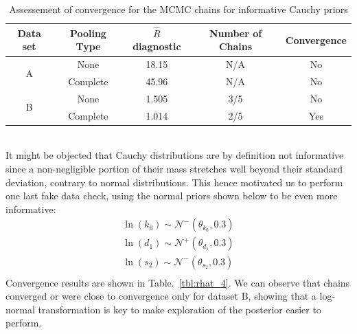\documentclass[11pt]{article}
\begin{document}
\begin{table}[!h]
    \centering
    \caption{Assessement of convergence for the MCMC chains for informative Cauchy priors}
    \begin{tabular}{c|c||c|c|c}
        \hline
        Data set & Pooling Type & $\hat{R}$ diagnostic & Number of Chains & Convergence  \\ \hline 
        \multirow{2}{*}{A}      & None  & 18.15 & N/A & No \\
                                & Complete & 45.96 & N/A & No \\ \hline 
        \multirow{2}{*}{B}      & None  & 1.505 & 3/5 & No \\
                                & Complete & 1.014 & 2/5 & Yes \\ \hline 
    \end{tabular}
    \label{tbl:rhat_3}
\end{table}
\\[12pt]
It might be objected that Cauchy distributions are by definition not informative since a non-negligible portion of their mass stretches well beyond their standard deviation, contrary to normal distributions. This hence motivated us to perform one last fake data check, using the normal priors shown below to be even more informative: 
\begin{align*}
    \ln(k_6) \sim \mathcal{N}^-(\theta_{k_6}, 0.3) \\ 
    \ln(d_1) \sim \mathcal{N}^+(\theta_{d_1}, 0.3) \\ 
    \ln(s_2) \sim \mathcal{N}^-(\theta_{s_2}, 0.3) \\ 
\end{align*}
Convergence results are shown in Table.~\ref{tbl:rhat_4}. We can observe that chains converged or were close to convergence only for dataset B, showing that a log-normal transformation is key to make exploration of the posterior easier to perform.
\end{document}
